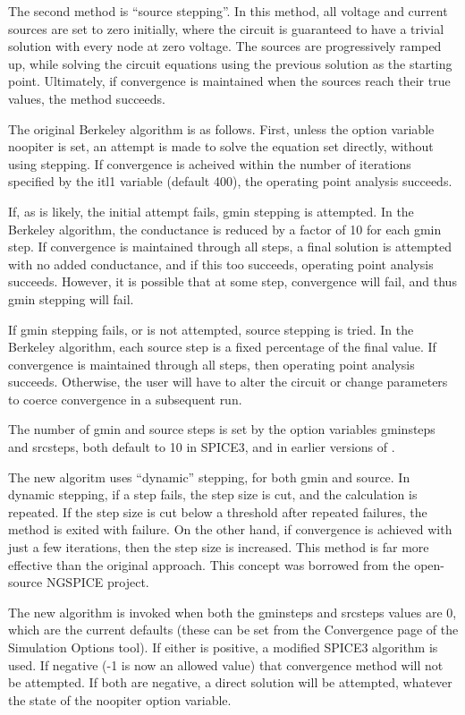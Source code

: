 The second method is ``source stepping''.  In this method, all voltage
and current sources are set to zero initially, where the circuit is
guaranteed to have a trivial solution with every node at zero voltage. 
The sources are progressively ramped up, while solving the circuit
equations using the previous solution as the starting point. 
Ultimately, if convergence is maintained when the sources reach their
true values, the method succeeds.

The original Berkeley algorithm is as follows.  First, unless the
option variable {\et noopiter} is set, an attempt is made to solve the
equation set directly, without using stepping.  If convergence is
acheived within the number of iterations specified by the {\et itl1}
variable (default 400), the operating point analysis succeeds.

If, as is likely, the initial attempt fails, gmin stepping is
attempted.  In the Berkeley algorithm, the conductance is reduced by a
factor of 10 for each gmin step.  If convergence is maintained through
all steps, a final solution is attempted with no added conductance,
and if this too succeeds, operating point analysis succeeds.  However,
it is possible that at some step, convergence will fail, and thus gmin
stepping will fail.

If gmin stepping fails, or is not attempted, source stepping is tried. 
In the Berkeley algorithm, each source step is a fixed percentage of
the final value.  If convergence is maintained through all steps, then
operating point analysis succeeds.  Otherwise, the user will have to
alter the circuit or change parameters to coerce convergence in a
subsequent run.

The number of gmin and source steps is set by the option variables
{\et gminsteps} and {\et srcsteps}, both default to 10 in SPICE3, and
in earlier versions of {\WRspice}.

The new algoritm uses ``dynamic'' stepping, for both gmin and source. 
In dynamic stepping, if a step fails, the step size is cut, and the
calculation is repeated.  If the step size is cut below a threshold
after repeated failures, the method is exited with failure.  On the
other hand, if convergence is achieved with just a few iterations,
then the step size is increased.  This method is far more effective
than the original approach.  This concept was borrowed from the
open-source NGSPICE project.

The new algorithm is invoked when both the {\et gminsteps} and {\et
srcsteps} values are 0, which are the current defaults (these can be
set from the {\cb Convergence} page of the {\cb Simulation Options}
tool).  If either is positive, a modified SPICE3 algorithm is used. 
If negative (-1 is now an allowed value) that convergence method will
not be attempted.  If both are negative, a direct solution will be
attempted, whatever the state of the {\et noopiter} option variable.

